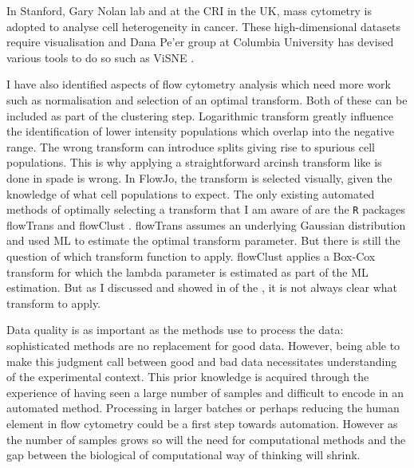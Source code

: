 In Stanford, Gary Nolan lab and at the CRI in the UK, mass cytometry is adopted to analyse cell heterogeneity in cancer.
These high-dimensional datasets require visualisation and Dana Pe'er group at Columbia University has devised various tools to do so such as ViSNE \citep{Amir:2013jp}.

I have also identified aspects of flow cytometry analysis which need more work such as normalisation and selection of an optimal transform.
Both of these can be included as part of the clustering step.
Logarithmic transform greatly influence the identification of lower intensity populations which overlap into the negative range.
The wrong transform can introduce splits giving rise to spurious cell populations.
This is why applying a straightforward arcinsh transform like is done in spade is wrong.
In FlowJo, the transform is selected visually, given the knowledge of what cell populations to expect.
The only existing automated  methods of optimally selecting a transform that I am aware of are the \texttt{R} packages \textsf{flowTrans} and \textsf{flowClust} \citep{flowTrans,flowClust}.
\textsf{flowTrans} assumes an underlying Gaussian distribution and used \gls{ML} to estimate the optimal transform parameter.
But there is still the question of which transform function to apply.
\textsf{flowClust} applies a Box-Cox transform for which the lambda parameter is estimated as part of the \gls{ML} estimation.
But as I discussed and showed in  of the , it is not always clear what transform to apply.


Data quality is as important as the methods use to process the data: sophisticated methods are no replacement for good data.
However, being able to make this judgment call between good and bad data necessitates understanding of the experimental context.
This prior knowledge is acquired through the experience of having seen a large number of samples and difficult to encode in an automated method.
Processing in larger batches or perhaps reducing the human element in flow cytometry could be a first step towards automation.
However as the number of samples grows so will the need for computational methods and the gap between the biological of computational way of thinking will shrink.

